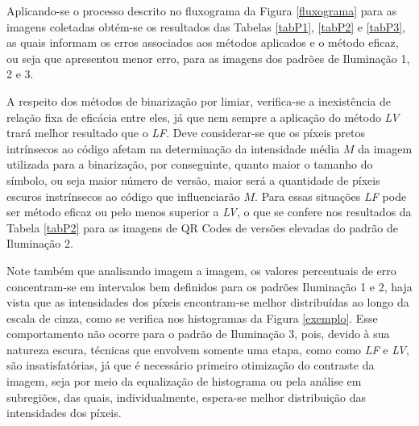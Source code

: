 \documentclass{ceel}
\begin{document}
\begin{multicols}{2}
\begin{minipage}[h]{\columnwidth}
\vspace{-0.1cm}
\caption{Imagens resultantes da Binarização em Sub-regiões para o QR Code 3 nos padrões de (a) Iluminação 1, (c) Iluminação 2 e (e) Iluminação 3, com suas respectivas imagens diferença em (b), (d) e (f).} \label{figS}
\end{minipage}

\vspace{0.4cm}

Aplicando-se o processo descrito no fluxograma da Figura \ref{fluxograma} para as imagens coletadas obtém-se os resultados das Tabelas \ref{tabP1}, \ref{tabP2} e \ref{tabP3}, as quais informam os erros associados aos métodos aplicados e o método eficaz, ou seja que apresentou menor erro, para as imagens dos padrões de Iluminação 1, 2 e 3. 

A respeito dos métodos de binarização por limiar, verifica-se a inexistência de relação fixa de eficácia entre eles, já que nem sempre a aplicação do método \emph{LV} trará melhor resultado que o \emph{LF}. Deve considerar-se que os píxeis pretos intrínsecos ao código afetam na determinação da intensidade média $M$ da imagem utilizada para a binarização, por conseguinte, quanto maior o tamanho do símbolo, ou seja maior número de versão, maior será a quantidade de píxeis escuros instrínsecos ao código que influenciarão $M$. Para essas situações \emph{LF} pode ser método eficaz ou pelo menos superior a \emph{LV}, o que se confere nos resultados da Tabela \ref{tabP2} para as imagens de QR Codes de versões elevadas do padrão de Iluminação 2.

Note também que analisando imagem a imagem, os valores percentuais de erro concentram-se em intervalos bem definidos para os padrões Iluminação 1 e 2, haja vista que as intensidades dos píxeis encontram-se melhor distribuídas ao longo da escala de cinza, como se verifica nos histogramas da Figura \ref{exemplo}. Esse comportamento não ocorre para o padrão de Iluminação 3, pois, devido à sua natureza escura, técnicas que envolvem somente uma etapa, como como \emph{LF} e \emph{LV}, são insatisfatórias, já que é necessário primeiro otimização do contraste da imagem, seja por meio da equalização de histograma ou pela análise em subregiões, das quais, individualmente, espera-se melhor distribuição das intensidades dos píxeis.


\end{multicols}
\end{document}
